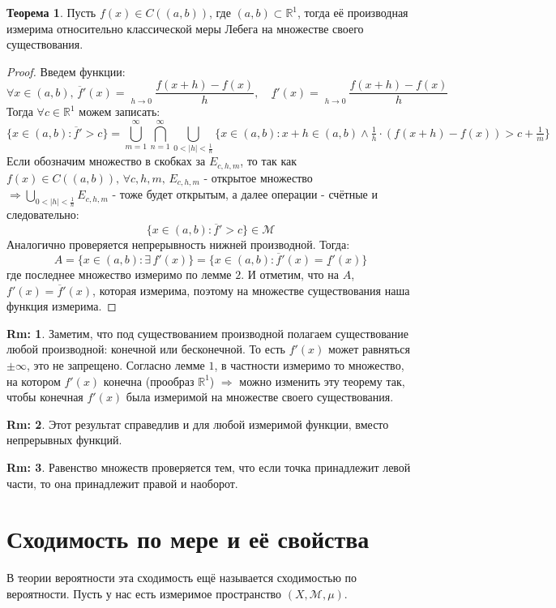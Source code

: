 \documentclass[12pt]{article}
\newcommand{\MR}{\mathbb{R}}
\newcommand{\MM}{\mathcal{M}}
\theoremstyle{definition}
\newtheorem{rem}{Rm:}
\newtheorem{theorem}{Теорема}
\newcommand{\ovl}[1]{\overline{#1}}
\DeclareMathOperator*\lowlim{\underline{lim}}
\DeclareMathOperator*\uplim{\overline{lim}}
\begin{document}
\begin{theorem}
	Пусть $f(x) \in C((a,b))$, где $(a,b) \subset \MR^1$, тогда её производная измерима относительно классической меры Лебега на множестве своего существования.
\end{theorem}
\begin{proof}
	Введем функции:
	$$
		\forall x \in (a,b), \, \ovl{f}'(x) = \uplim\limits_{h \to 0}\dfrac{f(x + h) - f(x)}{h}, \quad \underline{f}'(x) = \lowlim\limits_{h \to 0}\dfrac{f(x + h) - f(x)}{h}
	$$
	Тогда $\forall c \in \MR^1$ можем записать:
	$$
		\{x \in (a,b) \colon \ovl{f}' > c\} = \bigcup\limits_{m = 1}^{\infty}\bigcap\limits_{n = 1}^{\infty}\bigcup\limits_{0 < |h| < \frac{1}{n}}\{x \in (a,b) \colon x + h \in (a,b) \wedge \tfrac{1}{h}{\cdot}(f(x + h) - f(x)) > c + \tfrac{1}{m}\}
	$$
	Если обозначим множество в скобках за $E_{c,h,m}$, то так как $f(x) \in C((a,b)), \, \forall c,h,m, \, E_{c,h,m}$ - открытое множество $\Rightarrow  \bigcup\limits_{0 < |h| < \frac{1}{n}} E_{c,h,m}$ - тоже будет открытым, а далее операции - счётные и следовательно: 
	$$
		\{x \in (a,b) \colon \ovl{f}' > c\} \in \MM
	$$
	Аналогично проверяется непрерывность нижней производной. Тогда:
	$$
		A = \{x \in (a,b) \colon \exists \, f'(x)\} = \{x \in (a,b) \colon \ovl{f}'(x) = \underline{f}'(x)\}
	$$
	где последнее множество измеримо по лемме $2$. И отметим, что на $A$, $f'(x) = \ovl{f}'(x)$, которая измерима, поэтому на множестве существования наша функция измерима.
\end{proof}
\begin{rem}
	Заметим, что под существованием производной полагаем существование любой производной: конечной или бесконечной. То есть $f'(x)$ может равняться $\pm \infty$, это не запрещено. Согласно лемме $1$, в частности измеримо то множество, на котором $f'(x)$ конечна (прообраз $\MR^1$) $\Rightarrow$ можно изменить эту теорему так, чтобы конечная $f'(x)$ была измеримой на множестве своего существования.
\end{rem}
\begin{rem}
	Этот результат справедлив и для любой измеримой функции, вместо непрерывных функций.
\end{rem}
\begin{rem}
	Равенство множеств проверяется тем, что если точка принадлежит левой части, то она принадлежит правой и наоборот.
\end{rem}

\section*{Сходимость по мере и её свойства}
В теории вероятности эта  сходимость ещё называется сходимостью по вероятности. Пусть у нас есть измеримое пространство $(X,\MM,\mu)$.
\end{document}
